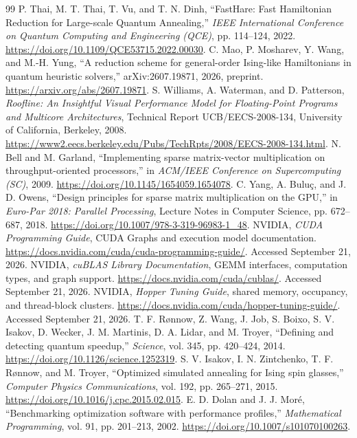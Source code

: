 \documentclass[11pt,a4paper]{article}
\begin{document}
\begin{thebibliography}{99}
 P. Thai, M. T. Thai, T. Vu, and T. N. Dinh, ``FastHare: Fast Hamiltonian Reduction for Large-scale Quantum Annealing,'' \textit{IEEE International Conference on Quantum Computing and Engineering (QCE)}, pp. 114--124, 2022. \url{https://doi.org/10.1109/QCE53715.2022.00030}.
 C. Mao, P. Mosharev, Y. Wang, and M.-H. Yung, ``A reduction scheme for general-order Ising-like Hamiltonians in quantum heuristic solvers,'' arXiv:2607.19871, 2026, preprint. \url{https://arxiv.org/abs/2607.19871}.
 S. Williams, A. Waterman, and D. Patterson, \textit{Roofline: An Insightful Visual Performance Model for Floating-Point Programs and Multicore Architectures}, Technical Report UCB/EECS-2008-134, University of California, Berkeley, 2008. \url{https://www2.eecs.berkeley.edu/Pubs/TechRpts/2008/EECS-2008-134.html}.
 N. Bell and M. Garland, ``Implementing sparse matrix-vector multiplication on throughput-oriented processors,'' in \textit{ACM/IEEE Conference on Supercomputing (SC)}, 2009. \url{https://doi.org/10.1145/1654059.1654078}.
 C. Yang, A. Bulu\c{c}, and J. D. Owens, ``Design principles for sparse matrix multiplication on the GPU,'' in \textit{Euro-Par 2018: Parallel Processing}, Lecture Notes in Computer Science, pp. 672--687, 2018. \url{https://doi.org/10.1007/978-3-319-96983-1_48}.
 NVIDIA, \textit{CUDA Programming Guide}, CUDA Graphs and execution model documentation. \url{https://docs.nvidia.com/cuda/cuda-programming-guide/}. Accessed September 21, 2026.
 NVIDIA, \textit{cuBLAS Library Documentation}, GEMM interfaces, computation types, and graph support. \url{https://docs.nvidia.com/cuda/cublas/}. Accessed September 21, 2026.
 NVIDIA, \textit{Hopper Tuning Guide}, shared memory, occupancy, and thread-block clusters. \url{https://docs.nvidia.com/cuda/hopper-tuning-guide/}. Accessed September 21, 2026.
 T. F. R{\o}nnow, Z. Wang, J. Job, S. Boixo, S. V. Isakov, D. Wecker, J. M. Martinis, D. A. Lidar, and M. Troyer, ``Defining and detecting quantum speedup,'' \textit{Science}, vol. 345, pp. 420--424, 2014. \url{https://doi.org/10.1126/science.1252319}.
 S. V. Isakov, I. N. Zintchenko, T. F. R\o nnow, and M. Troyer, ``Optimized simulated annealing for Ising spin glasses,'' \textit{Computer Physics Communications}, vol. 192, pp. 265--271, 2015. \url{https://doi.org/10.1016/j.cpc.2015.02.015}.
 E. D. Dolan and J. J. Mor\'e, ``Benchmarking optimization software with performance profiles,'' \textit{Mathematical Programming}, vol. 91, pp. 201--213, 2002. \url{https://doi.org/10.1007/s101070100263}.

\end{thebibliography}
\end{document}
